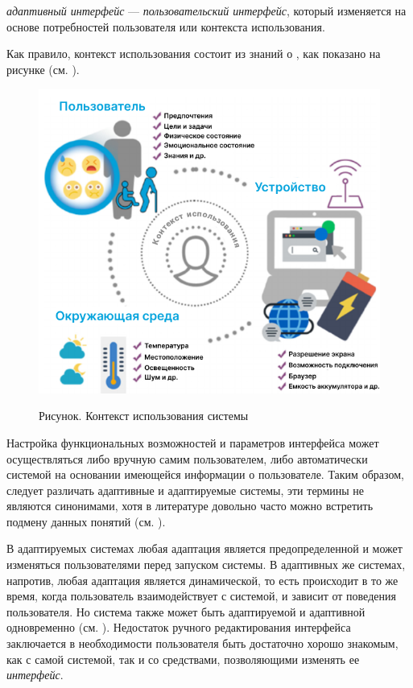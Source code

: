 \textit{адаптивный интерфейс} --- \textit{пользовательский интерфейс}, который изменяется на основе потребностей пользователя или контекста использования.

Как правило, контекст использования состоит из знаний о , как показано на рисунке \textit{} (см. ).

\begin{figure}[H]
	\caption{Рисунок. Контекст использования системы}
	\includegraphics[scale=0.5]{author/part4/figures/user-context.png}
	\label{fig:use_context}
\end{figure}

Настройка функциональных возможностей и параметров интерфейса может осуществляться либо вручную самим пользователем, либо автоматически системой на основании имеющейся информации о пользователе. Таким образом, следует различать адаптивные и адаптируемые системы, эти термины не являются синонимами, хотя в литературе довольно часто можно встретить подмену данных понятий (см. ).

В адаптируемых системах любая адаптация является предопределенной и может изменяться пользователями перед запуском системы. В адаптивных же системах, напротив, любая адаптация является динамической, то есть происходит в то же время, когда пользователь взаимодействует с системой, и зависит от поведения пользователя. Но система также может быть адаптируемой и адаптивной одновременно (см. ).
Недостаток ручного редактирования интерфейса заключается в необходимости пользователя быть достаточно хорошо знакомым, как с самой системой, так и со средствами, позволяющими изменять ее \textit{интерфейс}.

